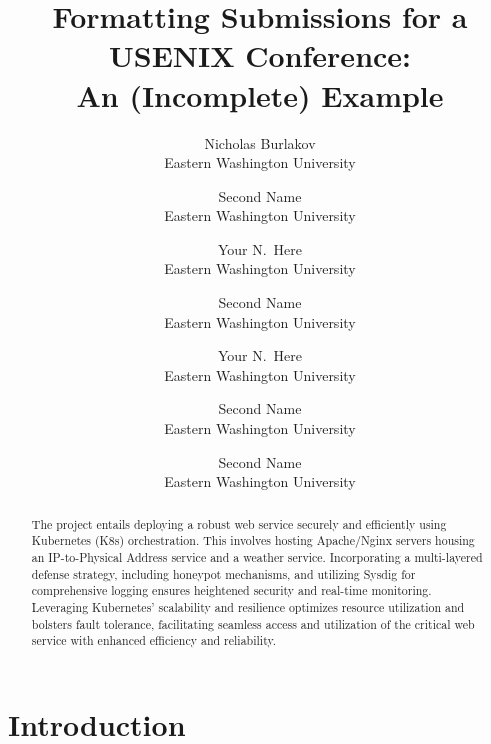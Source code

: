 \documentclass[letterpaper,twocolumn,10pt]{article}
\begin{document}

\date{}

\title{\Large \bf Formatting Submissions for a USENIX Conference:\\
  An (Incomplete) Example}

\author{
{\rm Nicholas Burlakov}\\
Eastern Washington University
\and
{\rm Second Name}\\
Eastern Washington University
\and
{\rm Your N.\ Here}\\
Eastern Washington University
\and
{\rm Second Name}\\
Eastern Washington University
\and
{\rm Your N.\ Here}\\
Eastern Washington University
\and
{\rm Second Name}\\
Eastern Washington University
\and
{\rm Second Name}\\
Eastern Washington University
} %

\maketitle

\begin{abstract}
The project entails deploying a robust web service securely and efficiently using Kubernetes (K8s) orchestration. This involves hosting Apache/Nginx servers housing an IP-to-Physical Address service and a weather service. Incorporating a multi-layered defense strategy, including honeypot mechanisms, and utilizing Sysdig for comprehensive logging ensures heightened security and real-time monitoring. Leveraging Kubernetes' scalability and resilience optimizes resource utilization and bolsters fault tolerance, facilitating seamless access and utilization of the critical web service with enhanced efficiency and reliability.
\end{abstract}


\section{Introduction}

\end{document}
